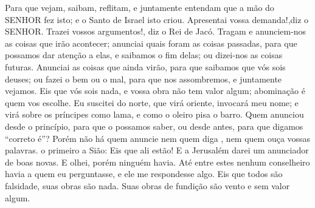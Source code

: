 {  Para que vejam, saibam, reflitam, e juntamente entendam que a mão do SENHOR fez isto; e o Santo de Israel isto criou.
  Apresentai vossa demanda!,diz o SENHOR. Trazei vossos argumentos!, diz o Rei de Jacó.
  Tragam e anunciem-nos as coisas que irão acontecer; anunciai quais foram as coisas passadas, para que possamos dar atenção a elas, e saibamos o fim delas; ou dizei-nos as coisas futuras.
  Anunciai as coisas que ainda virão, para que saibamos que vós sois deuses; ou fazei o bem ou o mal, para que nos assombremos, e juntamente vejamos.
  Eis que vós sois nada, e vossa obra não tem valor algum; abominação é quem vos escolhe.
  Eu suscitei
{} do norte, que virá oriente,
{} invocará meu nome; e virá sobre os príncipes como
{} lama, e como o oleiro pisa o barro.
  Quem anunciou
{} desde o princípio, para que o possamos saber, ou desde antes, para que digamos “correto é”? Porém não há quem anuncie
{} nem quem diga
{},  nem quem ouça vossas palavras.
   o primeiro
{} a Sião: Eis que ali estão! E a Jerusalém darei um anunciador de boas novas.
  E olhei, porém ninguém havia. Até entre estes nenhum conselheiro havia a quem eu perguntasse, e ele me respondesse algo.
  Eis que todos são falsidade, suas obras são nada. Suas obras de fundição são vento e sem valor algum.
\par }


